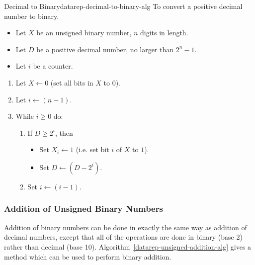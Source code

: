\begin{algorithm}{Decimal to Binary}{datarep-decimal-to-binary-alg}{
        To convert a positive decimal number to binary.
}

\begin{itemize}
\item   Let $X$ be an unsigned binary number, $n$ digits in length.
\item   Let $D$ be a positive decimal number, no larger than $2^{n} - 1$.
\item   Let $i$ be a counter.
\end{itemize}
\begin{enumerate}
\item   Let $X \leftarrow 0$ (set all bits in $X$ to $0$).
\item   Let $i \leftarrow (n - 1)$.
\item   While $i \geq 0$ do:
        \begin{enumerate}
        \item   If $D \geq 2^{i}$, then
                \begin{itemize}
                \item   Set $X_{i} \leftarrow 1$
                        (i.e. set bit $i$ of $X$ to $1$).
                \item   Set $D \leftarrow (D - 2^{i})$.
                \end{itemize}
        \item   Set $i \leftarrow (i - 1)$.
        \end{enumerate}
\end{enumerate}
\end{algorithm}

\subsubsection{Addition of Unsigned Binary Numbers}
\label{datarep-unsigned-addition-sec}

Addition of binary numbers can be done in exactly the same
way as addition of decimal numbers, except that all of the
operations are done in binary (base 2) rather than
decimal (base 10).
Algorithm~\ref{datarep-unsigned-addition-alg} gives a method
which can be used to perform binary addition.

